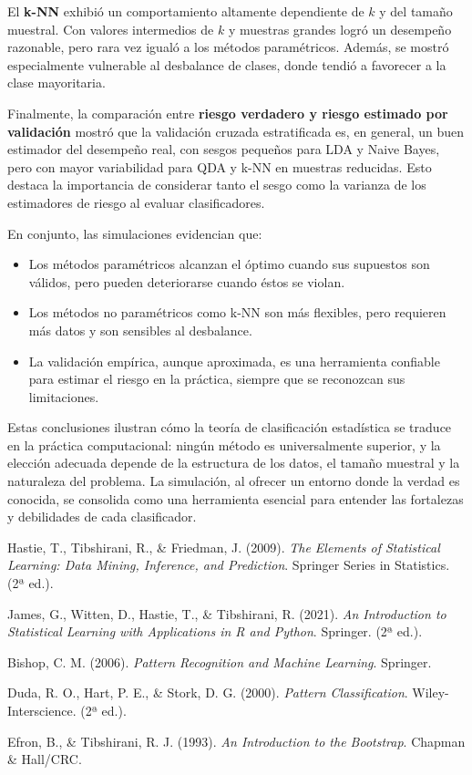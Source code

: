 \documentclass[10pt]{article}
\begin{document}
El \textbf{k-NN} exhibió un comportamiento altamente dependiente de $k$ y del tamaño muestral. 
Con valores intermedios de $k$ y muestras grandes logró un desempeño razonable, pero rara vez igualó a los métodos paramétricos. 
Además, se mostró especialmente vulnerable al desbalance de clases, donde tendió a favorecer a la clase mayoritaria.

Finalmente, la comparación entre \textbf{riesgo verdadero y riesgo estimado por validación} mostró que la validación cruzada estratificada es, en general, un buen estimador del desempeño real, 
con sesgos pequeños para LDA y Naive Bayes, pero con mayor variabilidad para QDA y k-NN en muestras reducidas. 
Esto destaca la importancia de considerar tanto el sesgo como la varianza de los estimadores de riesgo al evaluar clasificadores.

En conjunto, las simulaciones evidencian que:
\begin{itemize}
    \item Los métodos paramétricos alcanzan el óptimo cuando sus supuestos son válidos, pero pueden deteriorarse cuando éstos se violan.
    \item Los métodos no paramétricos como k-NN son más flexibles, pero requieren más datos y son sensibles al desbalance.
    \item La validación empírica, aunque aproximada, es una herramienta confiable para estimar el riesgo en la práctica, siempre que se reconozcan sus limitaciones.
\end{itemize}

Estas conclusiones ilustran cómo la teoría de clasificación estadística se traduce en la práctica computacional: 
ningún método es universalmente superior, y la elección adecuada depende de la estructura de los datos, el tamaño muestral y la naturaleza del problema. 
La simulación, al ofrecer un entorno donde la verdad es conocida, se consolida como una herramienta esencial para entender las fortalezas y debilidades de cada clasificador.


\begin{thebibliography}{9}

Hastie, T., Tibshirani, R., \& Friedman, J. (2009). 
\textit{The Elements of Statistical Learning: Data Mining, Inference, and Prediction}. 
Springer Series in Statistics. (2ª ed.).  

James, G., Witten, D., Hastie, T., \& Tibshirani, R. (2021). 
\textit{An Introduction to Statistical Learning with Applications in R and Python}. 
Springer. (2ª ed.).  

Bishop, C. M. (2006). 
\textit{Pattern Recognition and Machine Learning}. 
Springer.  

Duda, R. O., Hart, P. E., \& Stork, D. G. (2000). 
\textit{Pattern Classification}. 
Wiley-Interscience. (2ª ed.).  

Efron, B., \& Tibshirani, R. J. (1993). 
\textit{An Introduction to the Bootstrap}. 
Chapman \& Hall/CRC.  

\end{thebibliography}
\end{document}
